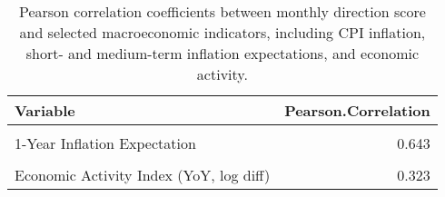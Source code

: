 \begin{table}[!h]
\centering
\caption{Pearson correlation coefficients between monthly direction score and selected macroeconomic indicators, including CPI inflation, short- and medium-term inflation expectations, and economic activity.}
\centering
\begin{tabular}[t]{lr}
\toprule
Variable & Pearson.Correlation\\
\midrule
\cellcolor{gray!10}{CPI Inflation (YoY, log diff)} & \cellcolor{gray!10}{0.499}\\
1-Year Inflation Expectation & 0.643\\
\cellcolor{gray!10}{3-Year Inflation Expectation} & \cellcolor{gray!10}{0.747}\\
Economic Activity Index (YoY, log diff) & 0.323\\
\bottomrule
\end{tabular}
\end{table}
